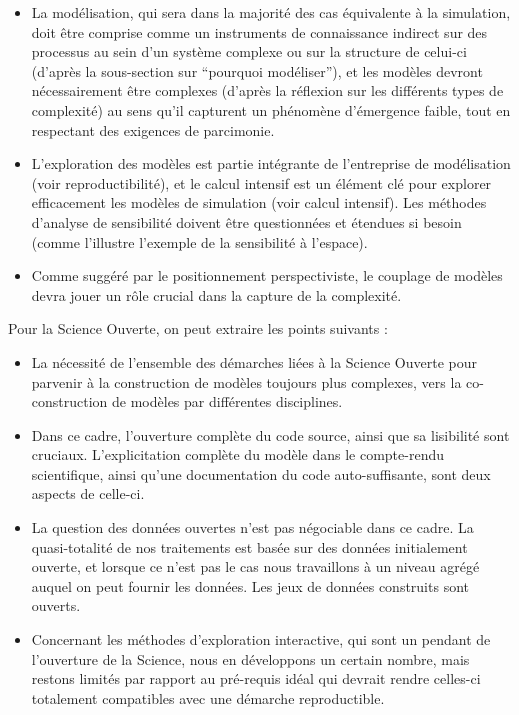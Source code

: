 \begin{itemize}
	\item La modélisation, qui sera dans la majorité des cas équivalente à la simulation, doit être comprise comme un instruments de connaissance indirect sur des processus au sein d'un système complexe ou sur la structure de celui-ci (d'après la sous-section sur ``pourquoi modéliser''), et les modèles devront nécessairement être complexes (d'après la réflexion sur les différents types de complexité) au sens qu'il capturent un phénomène d'émergence faible, tout en respectant des exigences de parcimonie.
	\item L'exploration des modèles est partie intégrante de l'entreprise de modélisation (voir reproductibilité), et le calcul intensif est un élément clé pour explorer efficacement les modèles de simulation (voir calcul intensif). Les méthodes d'analyse de sensibilité doivent être questionnées et étendues si besoin (comme l'illustre l'exemple de la sensibilité à l'espace).
	\item Comme suggéré par le positionnement perspectiviste, le couplage de modèles devra jouer un rôle crucial dans la capture de la complexité.
\end{itemize}

Pour la Science Ouverte, on peut extraire les points suivants :

\begin{itemize}
	\item La nécessité de l'ensemble des démarches liées à la Science Ouverte pour parvenir à la construction de modèles toujours plus complexes, vers la co-construction de modèles par différentes disciplines.
	\item Dans ce cadre, l'ouverture complète du code source, ainsi que sa lisibilité sont cruciaux. L'explicitation complète du modèle dans le compte-rendu scientifique, ainsi qu'une documentation du code auto-suffisante, sont deux aspects de celle-ci.
	\item La question des données ouvertes n'est pas négociable dans ce cadre. La quasi-totalité de nos traitements est basée sur des données initialement ouverte, et lorsque ce n'est pas le cas nous travaillons à un niveau agrégé auquel on peut fournir les données. Les jeux de données construits sont ouverts.
	\item Concernant les méthodes d'exploration interactive, qui sont un pendant de l'ouverture de la Science, nous en développons un certain nombre, mais restons limités par rapport au pré-requis idéal qui devrait rendre celles-ci totalement compatibles avec une démarche reproductible.
\end{itemize}

